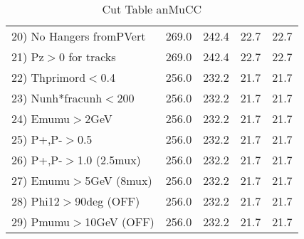 \begin{table}[h!]
\begin{tabular}{||l||r|r|r|r||}
 20) No Hangers fromPVert &       269.0 &       242.4 &        22.7 &        22.7 \\
 21) Pz$>$0 for tracks    &       269.0 &       242.4 &        22.7 &        22.7 \\
 22) Thprimord$<$0.4      &       256.0 &       232.2 &        21.7 &        21.7 \\
 23) Nunh*fracunh$<$200   &       256.0 &       232.2 &        21.7 &        21.7 \\
 24) Emumu$>$2GeV         &       256.0 &       232.2 &        21.7 &        21.7 \\
 25) P+,P-$>$0.5          &       256.0 &       232.2 &        21.7 &        21.7 \\
 26) P+,P-$>$1.0 (2.5mux) &       256.0 &       232.2 &        21.7 &        21.7 \\
 27) Emumu$>$5GeV  (8mux) &       256.0 &       232.2 &        21.7 &        21.7 \\
 28) Phi12$>$90deg  (OFF) &       256.0 &       232.2 &        21.7 &        21.7 \\
 29) Pmumu$>$10GeV  (OFF) &       256.0 &       232.2 &        21.7 &        21.7 \\
 \hline
 \hline
 \end{tabular}
 \caption{Cut Table  anMuCC }
 \label{tab-cut_anmcc}
 \end{table}
